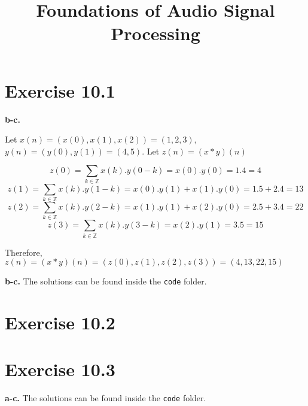 \documentclass[12pt]{article}
\title{Foundations of Audio Signal Processing\\ \ass}
\author{\auth}
\begin{document}
	\maketitle
	\section*{Exercise 10.1}
	    \textbf{b-c.}
	    
	        Let $ x(n) = (x(0), x(1), x(2)) = (1, 2, 3)$, $ y(n) = (y(0), y(1)) = (4, 5)$.
	        Let $ z(n) = (x * y)(n)$ \newline
	        
	        $$z(0) = \sum_{k \in \mathbb{Z}} x(k).y(0 - k) = x(0).y(0) = 1.4 = 4$$
	        $$z(1) = \sum_{k \in \mathbb{Z}} x(k).y(1 - k) = x(0).y(1) + x(1).y(0) = 1.5 + 2.4 = 13$$
	        $$z(2) = \sum_{k \in \mathbb{Z}} x(k).y(2 - k) = x(1).y(1) + x(2).y(0) = 2.5 + 3.4 = 22$$
	        $$z(3) = \sum_{k \in \mathbb{Z}} x(k).y(3 - k) = x(2).y(1) = 3.5 = 15$$
	        
	        Therefore, $z(n) = (x*y)(n) = (z(0), z(1), z(2), z(3)) = (4, 13, 22, 15)$ \newline
	        
	        
	        
	        
	    \textbf{b-c.} The solutions can be found inside the \texttt{code} folder.
	\section*{Exercise 10.2}
	\section*{Exercise 10.3}
	\textbf{a-c.} The solutions can be found inside the \texttt{code} folder.
\end{document}
